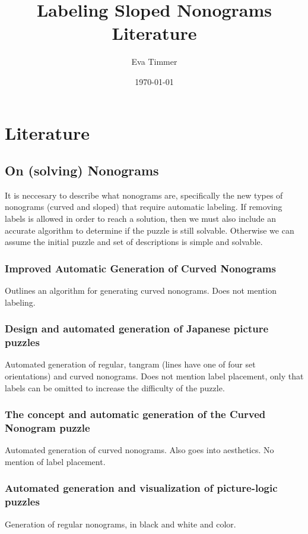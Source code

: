 \documentclass[a4paper]{article}
\title{Labeling Sloped Nonograms Literature}
\author{Eva Timmer}
\date{\today}
\begin{document}
\maketitle

\section{Literature}
\subsection{On (solving) Nonograms}
It is neccesary to describe what nonograms are, specifically the new types of nonograms (curved and sloped) that require automatic labeling. If removing labels is allowed in order to reach a solution, then we must also include an accurate algorithm to determine if the puzzle is still solvable. Otherwise we can assume the initial puzzle and set of descriptions is simple and solvable.\\
\subsubsection{Improved Automatic Generation of Curved Nonograms \cite{van2017improved}}
Outlines an algorithm for generating curved nonograms. Does not mention labeling.

\subsubsection{Design and automated generation of Japanese picture puzzles \cite{van2019design}}
Automated generation of regular, tangram (lines have one of four set orientations) and curved nonograms.  Does not mention label placement, only that labels can be omitted to increase the difficulty of the puzzle.

\subsubsection{The concept and automatic generation of the Curved Nonogram puzzle \cite{de2016concept}}
Automated generation of curved nonograms. Also goes into aesthetics. No mention of label placement.

\subsubsection{Automated generation and visualization of picture-logic puzzles \cite{ortiz2007automated}}
Generation of regular nonograms, in black and white and color. \\
\end{document}
